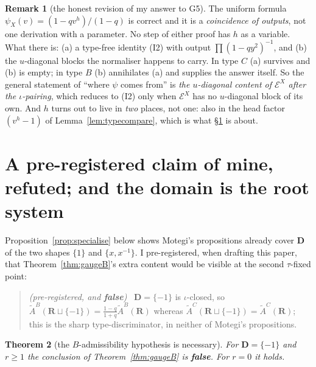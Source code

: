 \documentclass[11pt]{article}
\newtheorem{thm}{Theorem}
\theoremstyle{definition}
\newtheorem{rem}[thm]{Remark}
\newcommand{\At}{\widetilde{A}}
\newcommand{\bD}{\mathbf{D}}
\newcommand{\bR}{\mathbf{R}}
\newcommand{\EX}{\mathcal{E}^{X}}
\begin{document}
\begin{rem}[the honest revision of my answer to G5]\label{rem:G5}
The uniform formula $\psi_X(v)=(1-qv^{h})/(1-q)$ is correct and it is a
\emph{coincidence of outputs}, not one derivation with a parameter.  No step of
either proof has $h$ as a variable.  What there is: (a) a type-free identity
(I2) with output $\prod(1-qy^{2})^{-1}$, and (b) the $u$-diagonal blocks the
normaliser happens to carry.  In type $C$ (a) survives and (b) is empty; in type
$B$ (b) annihilates (a) and supplies the answer itself.  So the general
statement of ``where $\psi$ comes from'' is \emph{the $u$-diagonal content of
$\EX$ after the $\iota$-pairing}, which reduces to (I2) only when $\EX$ has no
$u$-diagonal block of its own.  And $h$ turns out to live in \emph{two} places,
not one: also in the head factor $(v^{h}-1)$ of Lemma~\ref{lem:typecompare},
which is what \S\ref{sec:beyond} is about.
\end{rem}

\section{A pre-registered claim of mine, refuted; and the domain is the root system}
\label{sec:beyond}

Proposition~\ref{prop:specialise} below shows Motegi's propositions already
cover $\bD$ of the two shapes $\{1\}$ and $\{x,x^{-1}\}$.  I pre-registered,
when drafting this paper, that Theorem~\ref{thm:gaugeB}'s extra content would be
visible at the second $\tau$-fixed point:

\begin{quote}
\emph{(pre-registered, and \textbf{false})} \ $\bD=\{-1\}$ is $\iota$-closed,
so $\At^{B}(\bR\sqcup\{-1\})=\frac{1-q}{1+q}\At^{B}(\bR)$ whereas
$\At^{C}(\bR\sqcup\{-1\})=\At^{C}(\bR)$; this is the sharp type-discriminator,
in neither of Motegi's propositions.
\end{quote}

\begin{thm}[the $B$-admissibility hypothesis is necessary]\label{thm:necessary}
For $\bD=\{-1\}$ and $r\ge1$ the conclusion of Theorem~\ref{thm:gaugeB} is
\textbf{false}.  For $r=0$ it holds.
\end{thm}
\end{document}
